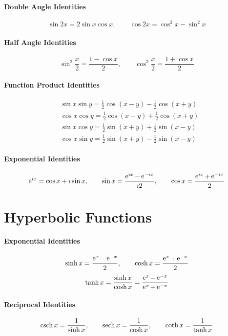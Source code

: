 \paragraph{Double Angle Identities}
\[\sin 2x = 2 \sin x \cos x, \qquad \cos 2x = \cos^2 x - \sin^2 x \]


\paragraph{Half Angle Identities}
\[\sin^2 \frac{x}{2} = \frac{1-\cos x}{2}, \qquad
\cos^2 \frac{x}{2} = \frac{1+\cos x}{2} \]

\paragraph{Function Product Identities}
\begin{align*}
  &\sin x \sin y = \frac{1}{2} \cos(x-y) - \frac{1}{2} \cos(x+y) \\
  &\cos x \cos y = \frac{1}{2} \cos(x-y) + \frac{1}{2} \cos(x+y) \\
  &\sin x \cos y = \frac{1}{2} \sin(x+y) + \frac{1}{2} \sin(x-y) \\
  &\cos x \sin y = \frac{1}{2} \sin(x+y) - \frac{1}{2} \sin(x-y) 
\end{align*}

\paragraph{Exponential Identities}
\[      
\mathop{\mathrm{e}}\nolimits^{\imath x} = \cos x + \imath \sin x, \qquad
\sin x = \frac{\mathop{\mathrm{e}}\nolimits^{\imath x} - \mathop{\mathrm{e}}\nolimits^{-\imath x}}{\imath 2}, \qquad
\cos x = \frac{\mathop{\mathrm{e}}\nolimits^{\imath x} + \mathop{\mathrm{e}}\nolimits^{-\imath x}}{2} 
\]

\section{Hyperbolic Functions}

\paragraph{Exponential Identities}
\[ \sinh x = \frac{\mathop{\mathrm{e}}\nolimits^x - \mathop{\mathrm{e}}\nolimits^{-x}}{2}, \qquad \cosh x = \frac{\mathop{\mathrm{e}}\nolimits^x + \mathop{\mathrm{e}}\nolimits^{-x}}{2}\]
\[ \tanh x = \frac{\sinh x}{\cosh x} = \frac{\mathop{\mathrm{e}}\nolimits^x - \mathop{\mathrm{e}}\nolimits^{-x}}{\mathop{\mathrm{e}}\nolimits^x + \mathop{\mathrm{e}}\nolimits^{-x}} \]

\paragraph{Reciprocal Identities}
\[ \mathop{\mathrm{csch}}\nolimits x = \frac{1}{\sinh x}, \qquad \mathop{\mathrm{sech}}\nolimits x = \frac{1}{\cosh x}, \qquad
\coth x = \frac{1}{\tanh x} \]

